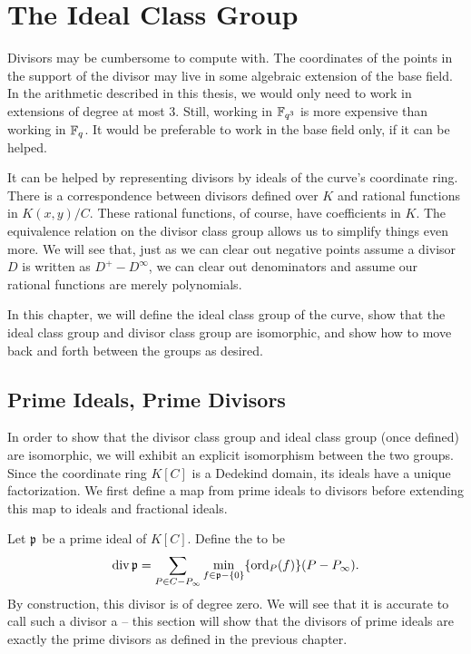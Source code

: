 
\section{The Ideal Class Group}
\label{chap_ideals}

Divisors may be cumbersome to compute with.
The coordinates of the points in the support of the divisor may live in some algebraic extension of the base field.
In the arithmetic described in this thesis, we would only need to work in extensions of degree at most 3.
Still, working in $\mathbb{F}_{q^3}$ is more expensive than working in $\mathbb{F}_q$.
It would be preferable to work in the base field only, if it can be helped.

It can be helped by representing divisors by ideals of the curve's coordinate ring.
There is a correspondence between divisors defined over $K$ and rational functions in $K(x,y)/C$.
These rational functions, of course, have coefficients in $K$.
The equivalence relation on the divisor class group allows us to simplify things even more.
We will see that, just as we can clear out negative points assume a divisor $D$ is written as $D^+ - D^\infty$,
we can clear out denominators and assume our rational functions are merely polynomials.

In this chapter, we will define the ideal class group of the curve,
show that the ideal class group and divisor class group are isomorphic,
and show how to move back and forth between the groups as desired.



\subsection{Prime Ideals, Prime Divisors}

In order to show that the divisor class group and ideal class group (once defined) are isomorphic,
we will exhibit an explicit isomorphism between the two groups.
Since the coordinate ring $K[C]$ is a Dedekind domain, its ideals have a unique factorization.
We first define a map from prime ideals to divisors before extending this map to ideals and fractional ideals.

Let $\frak p$ be a prime ideal of $K[C]$.
Define the  to be
  \[ \operatorname{div} \frak p = \sum_{P \in C - P_\infty} \min_{f \in \frak p - \{0\}}\{\operatorname{ord}_P(f)\}(P - P_\infty). \]
By construction, this divisor is of degree zero.
We will see that it is accurate to call such a divisor a  --
this section will show that the divisors of prime ideals are exactly the prime divisors as defined in the previous chapter.

